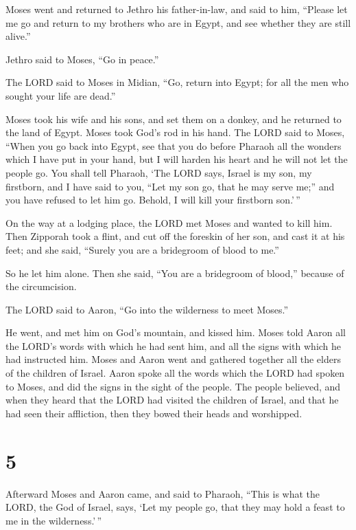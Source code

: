  Moses went and returned to Jethro his father-in-law, and
said to him, ``Please let me go and return to my brothers who are in
Egypt, and see whether they are still alive.''

Jethro said to Moses, ``Go in peace.''

 The LORD said to Moses in Midian, ``Go, return into Egypt;
for all the men who sought your life are dead.''

 Moses took his wife and his sons, and set them on a
donkey, and he returned to the land of Egypt. Moses took God's rod in
his hand.  The LORD said to Moses, ``When you go back into
Egypt, see that you do before Pharaoh all the wonders which I have put
in your hand, but I will harden his heart and he will not let the people
go.  You shall tell Pharaoh, `The LORD says, Israel is my
son, my firstborn,  and I have said to you, ``Let my son
go, that he may serve me;'' and you have refused to let him go. Behold,
I will kill your firstborn son.'\,''

 On the way at a lodging place, the LORD met Moses and
wanted to kill him.  Then Zipporah took a flint, and cut
off the foreskin of her son, and cast it at his feet; and she said,
``Surely you are a bridegroom of blood to me.''

 So he let him alone. Then she said, ``You are a bridegroom
of blood,'' because of the circumcision.

 The LORD said to Aaron, ``Go into the wilderness to meet
Moses.''

He went, and met him on God's mountain, and kissed him. 
Moses told Aaron all the LORD's words with which he had sent him, and
all the signs with which he had instructed him.  Moses and
Aaron went and gathered together all the elders of the children of
Israel.  Aaron spoke all the words which the LORD had
spoken to Moses, and did the signs in the sight of the people.
 The people believed, and when they heard that the LORD had
visited the children of Israel, and that he had seen their affliction,
then they bowed their heads and worshipped.

\hypertarget{section-4}{%
\section{5}\label{section-4}}

 Afterward Moses and Aaron came, and said to Pharaoh, ``This
is what the LORD, the God of Israel, says, `Let my people go, that they
may hold a feast to me in the wilderness.'\,''

